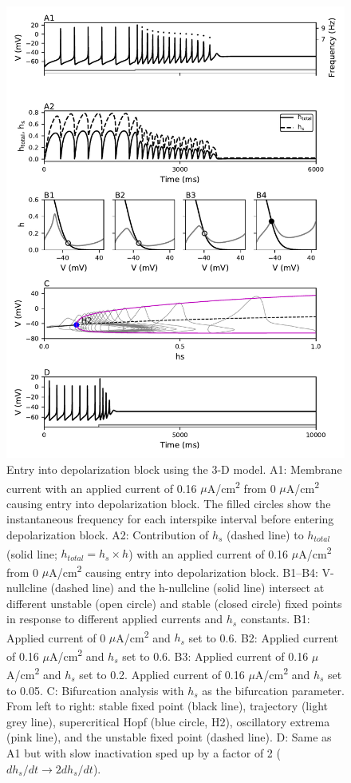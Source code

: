 \begin{figure}
	\centering
	\includegraphics[scale=0.7]{../figures/figure_3.pdf}
	\caption{Entry into depolarization block using the 3-D model. A1: Membrane current with an applied current of 0.16 $\mu$A/cm\textsuperscript{2} from 0 $\mu$A/cm\textsuperscript{2} causing entry into depolarization block. The filled circles show the instantaneous frequency for each interspike interval before entering depolarization block. A2: Contribution of $h_s$ (dashed line) to $h_{total}$ (solid line; $h_{total}= h_{s} \times h$) with an applied current of 0.16 $\mu$A/cm\textsuperscript{2} from 0 $\mu$A/cm\textsuperscript{2} causing entry into depolarization block. B1--B4: V-nullcline (dashed line) and the h-nullcline (solid line) intersect at different unstable (open circle) and stable (closed circle) fixed points in response to different applied currents and $h_s$ constants. B1: Applied current of 0 $\mu$A/cm\textsuperscript{2} and $h_s$ set to 0.6. B2: Applied current of 0.16 $\mu$A/cm\textsuperscript{2} and $h_s$ set to 0.6. B3: Applied current of 0.16 $\mu$A/cm\textsuperscript{2} and $h_s$ set to 0.2. Applied current of 0.16 $\mu$A/cm\textsuperscript{2} and $h_s$ set to 0.05. C: Bifurcation analysis with $h_s$ as the bifurcation parameter. From left to right: stable fixed point (black line), trajectory (light grey line), supercritical Hopf (blue circle, H2), oscillatory extrema (pink line), and the unstable fixed point (dashed line). D: Same as A1 but with slow inactivation sped up by a factor of 2 ($dh_s/dt \rightarrow 2dh_s/dt$).}
	\label{fig:3}
\end{figure}

